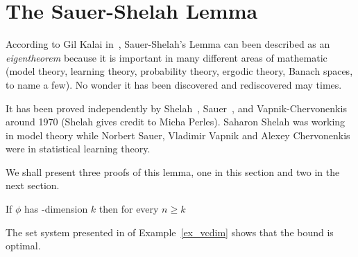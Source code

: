 \documentclass[sputnik.tex]{subfiles}
\begin{document}
\section{The Sauer-Shelah Lemma}

According to Gil Kalai in~\cite{kalai}, Sauer-Shelah's Lemma can been described as an \textit{eigentheorem\/} because it is important in many different areas of mathematic (model theory, learning theory, probability theory, ergodic theory, Banach spaces, to name a few).
No wonder it has been discovered and rediscovered may times.

It has been proved independently by Shelah~\cite{shelah72}, Sauer~\cite{sauer}, and Vapnik-Cher\-vo\-nen\-kis~\cite{VC} around 1970 (Shelah gives credit to Micha Perles).
Saharon Shelah was working in model theory while Norbert Sauer, Vladimir Vapnik and Alexey Chervonenkis were in statistical learning theory.

We shall present three proofs of this lemma, one in this section and two in the next section.

\begin{proposition}\label{prop_Sauer}
If $\phi$ has \vc-dimension $k$ then for every $n\ge k$

\end{proposition}

The set system presented in  of Example~\ref{ex_vcdim} shows that the bound is optimal.
\end{document}
